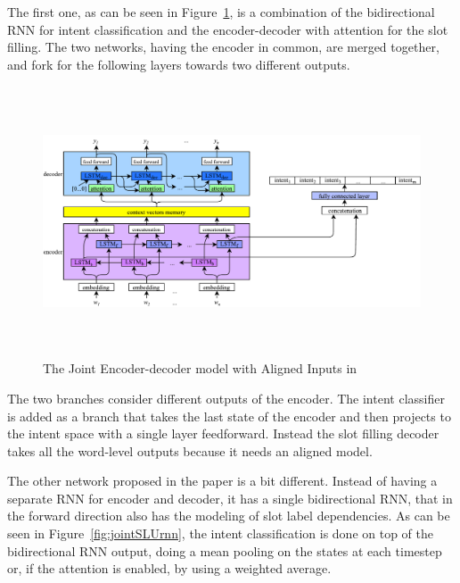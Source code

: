 The first one, as can be seen in Figure~\ref{fig:jointSLUAligned}, is a combination of the bidirectional RNN for intent classification and the encoder-decoder with attention for the slot filling. The two networks, having the encoder in common, are merged together, and fork for the following layers towards two different outputs.

\begin{figure}[!htbp]
    \centering
    \includegraphics[max width=\linewidth,max height=8cm,keepaspectratio]{figures/jointSLUAligned}
    \caption{The Joint Encoder-decoder model with Aligned Inputs in~\cite{liu2016attention}}\label{fig:jointSLUAligned}
\end{figure} 

The two branches consider different outputs of the encoder. The intent classifier is added as a branch that takes the last state of the encoder and then projects to the intent space with a single layer feedforward. Instead the slot filling decoder takes all the word-level outputs because it needs an aligned model.

The other network proposed in the paper is a bit different. Instead of having a separate RNN for encoder and decoder, it has a single bidirectional RNN, that in the forward direction also has the modeling of slot label dependencies. As can be seen in Figure~\ref{fig:jointSLUrnn}, the intent classification is done on top of the bidirectional RNN output, doing a mean pooling on the states at each timestep or, if the attention is enabled, by using a weighted average.

